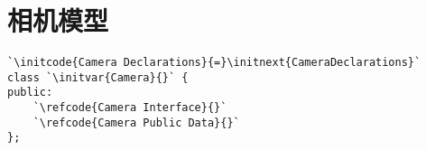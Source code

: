 \section{相机模型}\label{sec:相机模型}

\begin{lstlisting}
`\initcode{Camera Declarations}{=}\initnext{CameraDeclarations}`
class `\initvar{Camera}{}` {
public:
    `\refcode{Camera Interface}{}`
    `\refcode{Camera Public Data}{}`
};
\end{lstlisting}